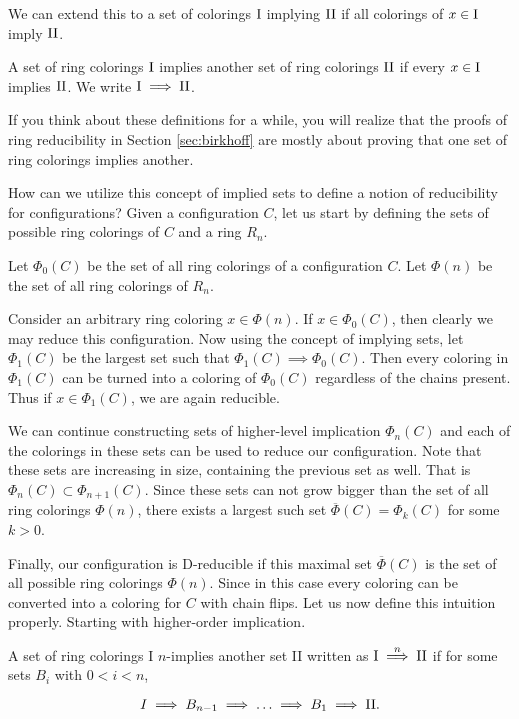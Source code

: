 We can extend this to a set of colorings $\text{I}$ implying $\text{II}$ if all colorings of $x \in \text{I}$ imply $\text{II}$.

\begin{definition}
    A set of ring colorings $\text{I}$ implies another set of ring colorings $\text{II}$ if every $x \in \text{I}$ implies $\text{II}$. We write $\text{I} \implies \text{II}$.
\end{definition}

If you think about these definitions for a while, you will realize that the proofs of ring reducibility in Section \ref{sec:birkhoff} are mostly about proving that one set of ring colorings implies another.

How can we utilize this concept of implied sets to define a notion of reducibility for configurations? Given a configuration $C$, let us start by defining the sets of possible ring colorings of $C$ and a ring $R_n$.

\begin{definition}
    Let $\Phi_0(C)$ be the set of all ring colorings of a configuration $C$. Let $\Phi(n)$ be the set of all ring colorings of $R_n$.
\end{definition}

Consider an arbitrary ring coloring $x \in \Phi(n)$. If $x \in \Phi_0(C)$, then clearly we may reduce this configuration. Now using the concept of implying sets, let $\Phi_1(C)$ be the largest set such that $\Phi_1(C) \implies \Phi_0(C)$. Then every coloring in $\Phi_1(C)$ can be turned into a coloring of $\Phi_0(C)$ regardless of the chains present. Thus if $x \in \Phi_1(C)$, we are again reducible.

We can continue constructing sets of higher-level implication $\Phi_n(C)$ and each of the colorings in these sets can be used to reduce our configuration. Note that these sets are increasing in size, containing the previous set as well. That is $\Phi_n(C) \subset \Phi_{n+1}(C)$. Since these sets can not grow bigger than the set of all ring colorings $\Phi(n)$, there exists a largest such set $\overline{\Phi}(C) = \Phi_k(C)$ for some $k > 0$.

Finally, our configuration is D-reducible if this maximal set $\overline{\Phi}(C)$ is the set of all possible ring colorings $\Phi(n)$. Since in this case every coloring can be converted into a coloring for $C$ with chain flips.  Let us now define this intuition properly. Starting with higher-order implication.

\begin{definition}
    A set of ring colorings I $n$-implies another set II written as $\text{I} \stackrel{n}{\implies} \text{II}$ if for some sets $B_{i}$ with $0 < i < n$,

    \begin{equation*}
        I \implies B_{n-1} \implies  \ldots \implies B_{1} \implies \text{II}.
    \end{equation*}
\end{definition}

